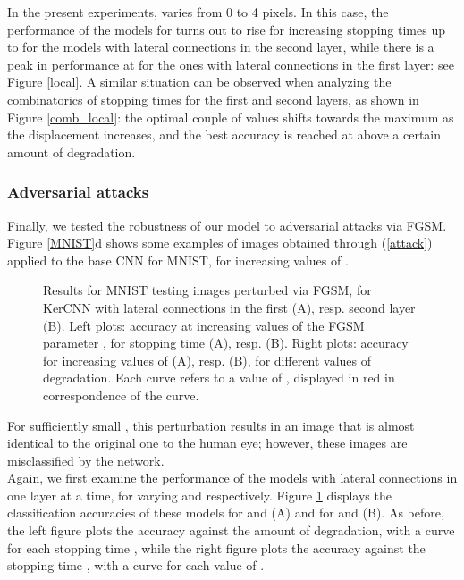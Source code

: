 \documentclass[11pt,oneside,reqno]{amsart}
\renewcommand{\baselinestretch}{1.5} \interfootnotelinepenalty=10000
\begin{document}
 In the present experiments,  varies from 0 to 4 pixels. In this case, the performance of the models for  turns out to rise for increasing stopping times up to  for the models with lateral connections in the second layer, while there is a peak in performance at  for the ones with lateral connections in the first layer: see Figure \ref{local}. A similar situation can be observed when analyzing the combinatorics of stopping times for the first and second layers, as shown in Figure \ref{comb_local}: the optimal couple of values  shifts towards the maximum as the displacement  increases, and the best accuracy is reached at  above a certain amount of degradation.
 
 
 \subsubsection{Adversarial attacks}  
  Finally, we tested the robustness of our model to adversarial attacks via FGSM. Figure \ref{MNIST}d shows some examples of images obtained through (\ref{attack}) applied to the base CNN for MNIST, for increasing values of . 
  \begin{figure}[htbp!]
  \centering
 {\renewcommand{\baselinestretch}{0}
 \;
 }
 \caption{Results for MNIST testing images perturbed via FGSM, for KerCNN with lateral connections in the first (A), resp. second layer (B). Left plots: accuracy at increasing values of the FGSM parameter , for stopping time  (A), resp.  (B). Right plots: accuracy for increasing values of  (A), resp.  (B), for different values of degradation. Each curve refers to a value of , displayed in red in correspondence of the curve.}\label{fgsm}
 \end{figure}
 For sufficiently small , this perturbation results in an image that is almost identical to the original one to the human eye; however, these images are misclassified by the network.\\
  Again, we first examine the performance of the models with lateral connections in one layer at a time, for varying  and  respectively. Figure \ref{fgsm} displays the classification accuracies of these models for  and  (A) and for  and  (B). As before, the left figure plots the accuracy against the amount of degradation, with a curve for each stopping time , while the right figure plots the accuracy against the stopping time , with a curve for each value of . 
\end{document}
